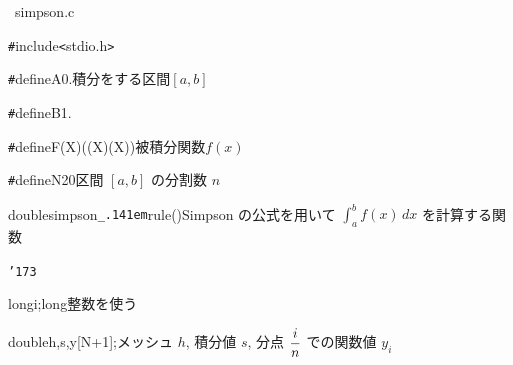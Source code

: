 \documentclass{article}
\begin{document}
\noindent
\mbox{}\rm\mc {\tt /}{\tt *}\charwd  \hrulefill\ simpson.c\ \hrulefill \rm\mc {}\charwd {\tt *}{\tt /}
\tt\mc 

\noindent
\mbox{}\hfill

\noindent
\mbox{}\hfill

\noindent
\mbox{}{\tt\#}include{\tt\mc {}\charwd}{\tt <}stdio.h{\tt >}

\noindent
\mbox{}{\tt\#}define{\tt\mc {}\charwd}A{\tt\mc {}\charwd}0.{\tt\mc {}\charwd}{\tt\mc {}\charwd}{\tt\mc {}\charwd}{\tt\mc {}\charwd}\rm\mc {\tt /}{\tt *}\charwd 積分をする区間\charwd $[a, b]$\rm\mc {}\charwd  \hfill \rm\mc {}\charwd {\tt *}{\tt /}
\tt\mc 

\noindent
\mbox{}{\tt\#}define{\tt\mc {}\charwd}B{\tt\mc {}\charwd}1.

\noindent
\mbox{}{\tt\#}define{\tt\mc {}\charwd}F(X){\tt\mc {}\charwd}((X){\tt *}(X)){\tt\mc {}\charwd}{\tt\mc {}\charwd}{\tt\mc {}\charwd}\rm\mc {\tt /}{\tt *}\charwd 被積分関数\charwd $f(x)$\rm\mc {}\charwd  \hfill \rm\mc {}\charwd {\tt *}{\tt /}
\tt\mc 

\noindent
\mbox{}{\tt\#}define{\tt\mc {}\charwd}N{\tt\mc {}\charwd}20{\tt\mc {}\charwd}{\tt\mc {}\charwd}{\tt\mc {}\charwd}{\tt\mc {}\charwd}\rm\mc {\tt /}{\tt *}\charwd  {}区間 $[a, b]$ の分割数 $n$
					   \hfill \rm\mc {}\charwd {\tt *}{\tt /}
\tt\mc 

\noindent
\mbox{}\hfill

\noindent
\mbox{}double{\tt\mc {}\charwd}simpson{\tt\_\kern.141em}rule(){\tt\mc {}\charwd}{\tt\mc {}\charwd}{\tt\mc {}\charwd}\rm\mc {\tt /}{\tt *}\charwd  {}Simpson の公式を用いて
					   $\displaystyle\int_a^b f(x)\,dx$
					   を計算する関数 \hfill \rm\mc {}\charwd {\tt *}{\tt /}
\tt\mc 

\noindent
\mbox{}{\tt\char'173}

\noindent
\mbox{}{\tt\mc {}\charwd}long{\tt\mc {}\charwd}i;{\tt\mc {}\charwd}{\tt\mc {}\charwd}{\tt\mc {}\charwd}{\tt\mc {}\charwd}\rm\mc {\tt /}{\tt *}\charwd long\charwd 整数を使う\charwd  \hfill \rm\mc {}\charwd {\tt *}{\tt /}
\tt\mc 

\noindent
\mbox{}{\tt\mc {}\charwd}double{\tt\mc {}\charwd}h,{\tt\mc {}\charwd}s,{\tt\mc {}\charwd}y[N{\tt\mc {}\charwd}+{\tt\mc {}\charwd}1];{\tt\mc {}\charwd}{\tt\mc {}\charwd}\rm\mc {\tt /}{\tt *}\charwd  {}メッシュ $h$, 積分値 $s$,
					   分点 $\displaystyle{i\over n}$
					   での関数値 $y_i$ \hfill \rm\mc {}\charwd {\tt *}{\tt /}
\tt\mc 
\end{document}
